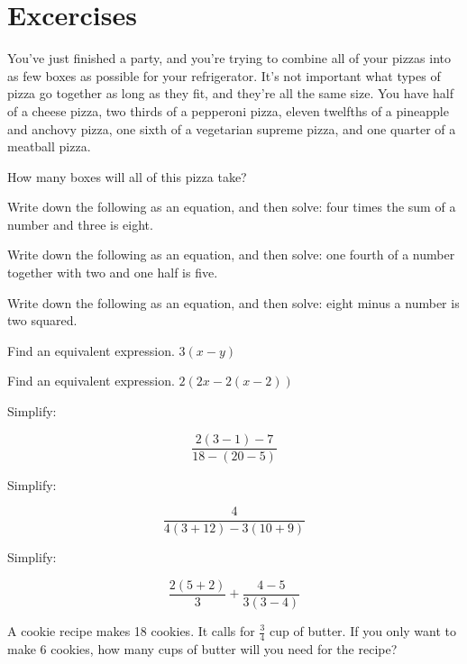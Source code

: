 \section*{Excercises}
\begin{exercise}
	You've just finished a party, and you're trying to combine all of your pizzas into as few boxes as possible for your refrigerator.  It's not important what types of pizza go together as long as they fit, and they're all the same size.  You have half of a cheese pizza, two thirds of a pepperoni pizza, eleven twelfths of a pineapple and anchovy pizza, one sixth of a vegetarian supreme pizza, and one quarter of a meatball pizza.
	
	How many boxes will all of this pizza take?
	
\end{exercise}
\bigskip
\begin{exercise}
	Write down the following as an equation, and then solve: four times the sum of a number and three is eight.
\end{exercise}
\bigskip
\begin{exercise}
	Write down the following as an equation, and then solve: one fourth of a number together with two and one half is five.
\end{exercise}
\bigskip
\begin{exercise}
	Write down the following as an equation, and then solve: eight minus a number is two squared.
\end{exercise}
\bigskip
\begin{exercise}
	Find an equivalent expression.  $3(x-y)$
\end{exercise}
\bigskip
\begin{exercise}
	Find an equivalent expression.  $2(2x - 2(x - 2))$
\end{exercise}
\bigskip
\begin{exercise}
	Simplify:
	
	$$\frac{2(3-1)-7}{18-(20-5)}$$
\end{exercise}
\bigskip
\begin{exercise}
	Simplify:
	
	$$\frac{4}{4(3+12)-3(10+9)}$$
\end{exercise}
\bigskip
\begin{exercise}
	Simplify:
	
	$$\frac{2(5+2)}{3} + \frac{4-5}{3(3-4)}$$
\end{exercise}
\bigskip
\begin{exercise}
A cookie recipe makes 18 cookies.  It calls for $\frac{3}{4}$ cup of butter.  If you only want to make 6 cookies, how many cups of butter will you need for the recipe?
\end{exercise}
